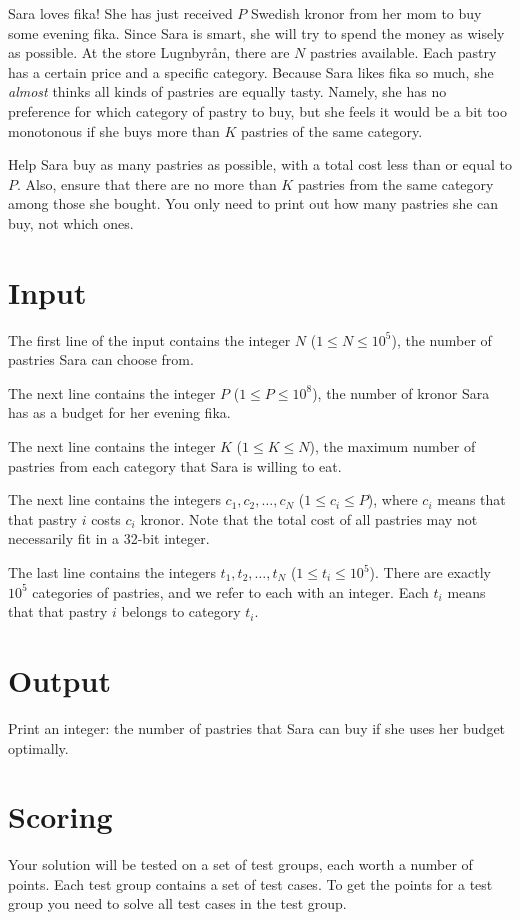\noindent
Sara loves fika! She has just received $P$ Swedish kronor from her mom to buy some evening fika.
Since Sara is smart, she will try to spend the money as wisely as possible. At the store Lugnbyrån,
there are $N$ pastries available. Each pastry has a certain price and a specific category.
Because Sara likes fika so much, she \textit{almost} thinks all kinds of pastries are equally tasty.
Namely, she has no preference for which category of pastry to buy, but she feels it would be
a bit too monotonous if she buys more than $K$ pastries of the same category.

Help Sara buy as many pastries as possible, with a total cost less than or equal to $P$.
Also, ensure that there are no more than $K$ pastries from the same category among those she bought.
You only need to print out how many pastries she can buy, not which ones.

\section*{Input}
The first line of the input contains the integer $N$ ($1 \leq N \leq 10^5$), the number of pastries
Sara can choose from.

The next line contains the integer $P$ ($1 \leq P \leq 10^8$), the number of kronor Sara has as a
budget for her evening fika.

The next line contains the integer $K$ ($1 \leq K \leq N$), the maximum number of pastries from
each category that Sara is willing to eat.

The next line contains the integers $c_1, c_2, \dots, c_N$ ($1 \leq c_i \leq P$), where $c_i$ means that
that pastry $i$ costs $c_i$ kronor. Note that the total cost of all pastries may not necessarily fit
in a 32-bit integer.

The last line contains the integers $t_1, t_2, \dots, t_N$ ($1 \leq t_i \leq 10^5$). There are
exactly $10^5$ categories of pastries, and we refer to each with an integer. Each $t_i$ means that
that pastry $i$ belongs to category $t_i$.


\section*{Output}
Print an integer: the number of pastries that Sara can buy if she uses her budget optimally.

\section*{Scoring}
Your solution will be tested on a set of test groups, each worth a number of points. Each test group contains
a set of test cases. To get the points for a test group you need to solve all test cases in the test group.

